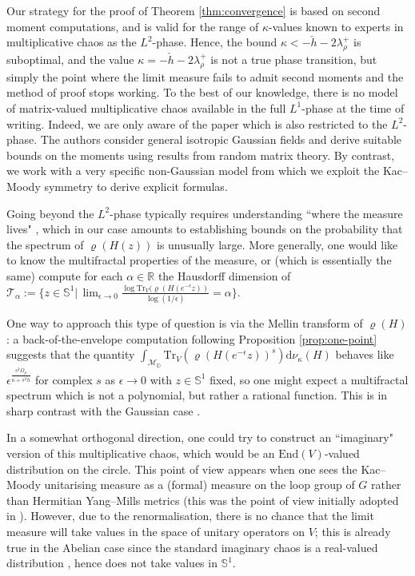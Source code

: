 \documentclass[12pt,a4paper]{amsart}
\numberwithin{equation}{section}
\theoremstyle{remark}
\theoremstyle{definition}
\renewcommand{\S}{\mathbb S}
\newcommand{\D}{\mathbb D}
\renewcommand{\d}{\mathrm d}
\newcommand{\R}{\mathbb R}
\newcommand{\cM}{\mathcal M}
\newcommand{\cT}{\mathcal{T}}
\begin{document}
Our strategy for the proof of Theorem \ref{thm:convergence} is based on second moment computations, and is valid for the range of $\kappa$-values known to experts in multiplicative chaos as the $L^2$-phase. Hence, the bound $\kappa<-\check h-2\lambda_\rho^+$ is suboptimal, and the value $\kappa=-\check h-2\lambda_\rho^+$ is not a true phase transition, but simply the point where the limit measure fails to admit second moments and the method of proof stops working. To the best of our knowledge, there is no model of matrix-valued multiplicative chaos available in the full $L^1$-phase at the time of writing. Indeed, we are only aware of the paper \cite{CRV13} which is also restricted to the $L^2$-phase. The authors consider general isotropic Gaussian fields and derive suitable bounds on the moments using results from random matrix theory. By contrast, we work with a very specific non-Gaussian model from which we exploit the Kac--Moody symmetry to derive explicit formulas.

Going beyond the $L^2$-phase typically requires understanding ``where the measure lives" \cite{RV14-review,Berestycki}, which in our case amounts to establishing bounds on the probability that the spectrum of $\varrho(H(z))$ is unusually large. More generally, one would like to know the multifractal properties of the measure, or (which is essentially the same) compute for each $\alpha\in\R$ the Hausdorff dimension of $\cT_\alpha:=\lbrace z\in\S^1|\,\lim_{\epsilon\to0}\frac{\log\mathrm{Tr}_V(\varrho(H(e^{-\epsilon}z))}{\log(1/\epsilon)}=\alpha\rbrace$.

One way to approach this type of question is via the Mellin transform of $\varrho(H)$: a back-of-the-envelope computation following Proposition \ref{prop:one-point} suggests that the quantity $\int_{\cM_\D}\mathrm{Tr}_V(\varrho(H(e^{-\epsilon}z))^s)\d\nu_\kappa(H)$ behaves like $\epsilon^\frac{s^2\Omega_\rho}{\kappa+s^2\check h}$ for complex $s$ as $\epsilon\to0$ with $z\in\S^1$ fixed, so one might expect a multifractal spectrum which is not a polynomial, but rather a rational function. This is in sharp contrast with the Gaussian case \cite[Section 4]{RV14-review}.

In a somewhat orthogonal direction, one could try to construct an ``imaginary" version of this multiplicative chaos, which would be an $\mathrm{End}(V)$-valued distribution on the circle. This point of view appears when one sees the Kac--Moody unitarising measure as a (formal) measure on the loop group of $G$ rather than Hermitian Yang--Mills metrics (this was the point of view initially adopted in \cite{Bav26}). However, due to the renormalisation, there is no chance that the limit measure will take values in the space of unitary operators on $V$; this is already true in the Abelian case since the standard imaginary chaos is a real-valued distribution \cite{LRV15,JSW20}, hence does not take values in $\S^1$.  
\end{document}
